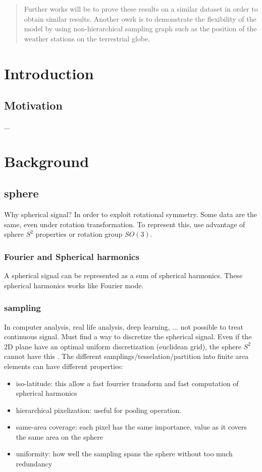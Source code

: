 \documentclass[11pt]{report}
\begin{document}
\begin{abstract}
Further works will be to prove these results on a similar dataset in order to obtain similar results. Another owrk is to demonstrate the flexibility of the model by using non-hierarchical sampling graph such as the position of the weather stations on the terrestrial globe.
\end{abstract}
\chapter{Introduction}
\section{Motivation}
...

\chapter{Background}
\section{sphere}


Why spherical signal? In order to exploit rotational symmetry. Some data are the same, even under rotation transformation. To represent this, use advantage of sphere $S^2$ properties or rotation group $SO(3)$.

\subsection{Fourier and Spherical harmonics}
A spherical signal can be represented as a sum of spherical harmonics. These spherical harmonics  works like Fourier mode.


\subsection{sampling}\label{sec:sampling}
In computer analysis, real life analysis, deep learning, ... not possible to treat continuous signal. Must find a way to discretize the spherical signal. Even if the 2D plane have an optimal uniform discretization (euclidean grid), the sphere $S^2$ cannot have this \cite{cohen_spherical_2018}\cite{perraudin_deepsphere:_2018}. %
The different samplings/tesselation/partition into finite area elements can have different properties:
\begin{itemize}
    \item iso-latitude: this allow a fast fourrier transform and fast computation of spherical harmonics
    \item hierarchical pixelization: useful for pooling operation.
    \item same-area coverage: each pixel has the same importance, value as it covers the same area on the sphere
    \item uniformity: how well the sampling spans the sphere without too much redundancy
\end{itemize}
\end{document}

